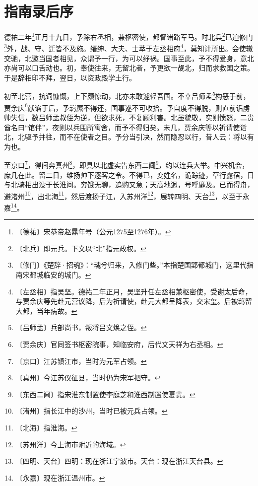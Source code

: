 \documentclass[12pt,UTF-8,openany,a4]{ctexbook}
\begin{document}
\chapter{指南录后序}

\begin{large}
    
    德祐二年\footnote{〔德祐〕\yiwen 宋恭帝赵㬎年号（公元1275至1276年）。}正月十九日，予除右丞相，兼枢密使，都督诸路军马。时北兵\footnote{〔北兵〕\yiwen 即元兵。下文以“北”指元政权。}已迫修门\footnote{〔修门〕\yiwen 《楚辞·招魂》：“魂兮归来，入修门些。”本指楚国郢都城门，这里代指南宋都城临安的城门。}外，战、守、迁皆不及施。缙绅、大夫、士萃于左丞相府\footnote{〔左丞相〕\yiwen 指吴坚。德祐二年正月，吴坚升任左丞相兼枢密使，受谢太后命，与贾余庆等先赴元营议降，后为祈请使，赴元大都呈降表，交宋玺。后被羁留大都，当年病故。}，莫知计所出。会使辙交驰，北邀当国者相见，众谓予一行，为可以纾祸。国事至此，予不得爱身，意北亦尚可以口舌动也。初，奉使往来，无留北者，予更欲一觇北，归而求救国之策。于是辞相印不拜，翌日，以资政殿学土行。
    
    初至北营，抗词慷慨，上下颇惊动，北亦未敢遽轻吾国。不幸吕师孟\footnote{〔吕师孟〕\yiwen 兵部尚书，叛将吕文焕之侄。}构恶于前，贾余庆\footnote{〔贾余庆〕\yiwen 官同签书枢密院事，知临安府，后代文天祥为右丞相。}献谄于后，予羁縻不得还，国事遂不可收拾。予自度不得脱，则直前诟虏帅失信，数吕师孟叔侄为逆，但欲求死，不复顾利害。北虽貌敬，实则愤怒，二贵酋名曰“馆伴”，夜则以兵围所寓舍，而予不得归矣。未几，贾余庆等以祈请使诣北，北驱予并往，而不在使者之目。予分当引决，然而隐忍以行，昔人云：将以有为也。
    
    至京口\footnote{〔京口〕\yiwen 江苏镇江市，当时为元军占领。}，得间奔真州\footnote{〔真州〕\yiwen 今江苏仪征县，当时仍为宋军把守。}，即具以北虚实告东西二阃\footnote{〔东西二阃〕\yiwen 指宋淮东制置使李庭芝和淮西制置使夏贵。}，约以连兵大举。中兴机会，庶几在此。留二日，维扬帅下逐客之令。不得已，变姓名，诡踪迹，草行露宿，日与北骑相出没于长淮间。穷饿无聊，追购又急；天高地迥，号呼靡及。已而得舟，避渚州\footnote{〔渚州〕\yiwen 指长江中的沙州，当时已被元兵占领。}，出北海\footnote{〔北海〕\yiwen 指淮海。}，然后渡扬子江，入苏州洋\footnote{〔苏州洋〕\yiwen 今上海市附近的海域。}，展转四明、天台\footnote{〔四明、天台〕\yiwen 四明：现在浙江宁波市。天台：现在浙江天台县。}，以至于永嘉\footnote{〔永嘉〕\yiwen 现在浙江温州市。}。
    

\end{large}
\end{document}
